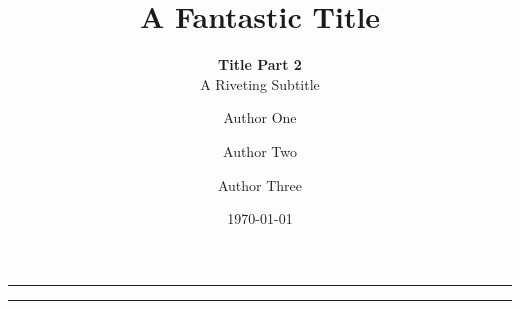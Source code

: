 \title{A Fantastic Title}
\subtitle{{\vspace{-1em}\huge \color{myDarkBlue}\textbf{Title Part
                2}}\\\vspace{1.5em}A Riveting Subtitle}

\author[1]{Author One}
\author[2]{Author Two}
\author[2, $\dagger$]{Author Three}


\newcommand{\compactAuthor}{My Group of Authors}

\date{\today}

\onecolumn

\maketitle

\thispagestyle{empty}
\vfill
\hrule

\begin{abstract}
    \lipsum[1]
\end{abstract}

\hrule
\vfill

\twocolumn

\setcounter{page}{1}
